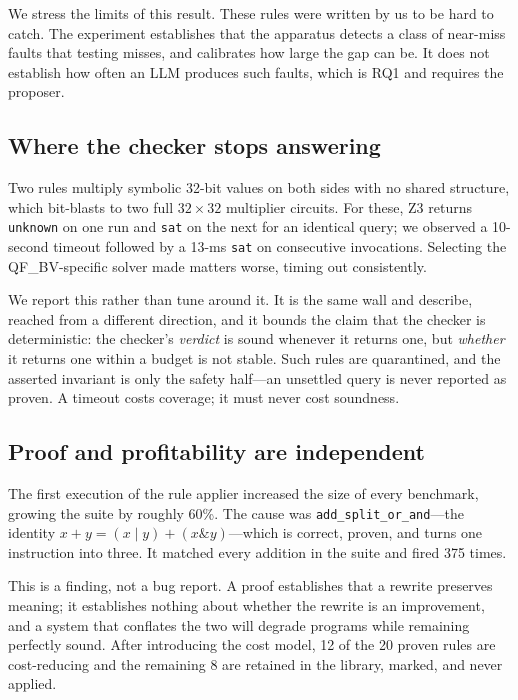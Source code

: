 \documentclass[conference]{IEEEtran}
\begin{document}
We stress the limits of this result. These rules were written by us to be hard
to catch. The experiment establishes that the apparatus detects a class of
near-miss faults that testing misses, and calibrates how large the gap can be.
It does not establish how often an LLM produces such faults, which is RQ1 and
requires the proposer.

\subsection{Where the checker stops answering}

Two rules multiply symbolic 32-bit values on both sides with no shared
structure, which bit-blasts to two full $32\times32$ multiplier circuits. For
these, Z3 returns \texttt{unknown} on one run and \texttt{sat} on the next for
an identical query; we observed a 10-second timeout followed by a 13-ms
\texttt{sat} on consecutive invocations. Selecting the QF\_BV-specific solver
made matters worse, timing out consistently.

We report this rather than tune around it. It is the same wall
\cite{cov} and \cite{llmveriopt} describe, reached from a different direction,
and it bounds the claim that the checker is deterministic: the checker's
\emph{verdict} is sound whenever it returns one, but \emph{whether} it returns
one within a budget is not stable. Such rules are quarantined, and the asserted
invariant is only the safety half---an unsettled query is never reported as
proven. A timeout costs coverage; it must never cost soundness.

\subsection{Proof and profitability are independent}

The first execution of the rule applier increased the size of every benchmark,
growing the suite by roughly 60\%. The cause was
\texttt{add\_split\_or\_and}---the identity
$x + y = (x \mathbin{|} y) + (x \mathbin{\&} y)$---which is correct, proven, and
turns one instruction into three. It matched every addition in the suite and
fired 375 times.

This is a finding, not a bug report. A proof establishes that a rewrite
preserves meaning; it establishes nothing about whether the rewrite is an
improvement, and a system that conflates the two will degrade programs while
remaining perfectly sound. After introducing the cost model, 12 of the 20
proven rules are cost-reducing and the remaining 8 are retained in the library,
marked, and never applied.
\end{document}
